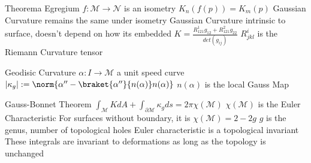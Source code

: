 \documentclass[14pt]{extarticle}
\begin{document}
\begin{outline}
	\1	Theorema Egregium
		\2	$f : \mathcal{M} \rightarrow \mathcal{N}$ is an isometry
		\2	$K_n(f(p)) = K_m(p)$
		\2	Gaussian Curvature remains the same under isometry
		\2	Gaussian Curvature intrinsic to surface, doesn't depend on how its embedded 
		\2	$K = \frac{R^1_{121}g_{12} + R^2_{121}g_{22}}{det(g_{ij})}$
			\3	$R^i_{jkl}$ is the Riemann Curvature tensor

	\1	Geodisic Curvature
		\2	$\alpha : I \rightarrow \mathcal{M}$ a unit speed curve 
		\2	$|\kappa_g| := \norm{\alpha'' - \braket{\alpha''}{n(\alpha)}n(\alpha)}$
			\3	$n(\alpha)$ is the local Gauss Map
	
	\1	Gauss-Bonnet Theorem
		\2	$\int_{\mathcal{M}}K dA + \int_{\partial \mathcal{M}}\kappa_g ds = 2\pi \chi(\mathcal{M})$
		\2	$\chi(\mathcal{M})$ is the Euler Characteristic
			\3	For surfaces without boundary, it is $\chi(\mathcal{M}) = 2 - 2g$
				\4	$g$ is the genus, number of topological holes
		\2	Euler characteristic is a topological invariant
		\2	These integrals are invariant to deformations as long as the topology is unchanged
	\end{outline}
\end{document}
